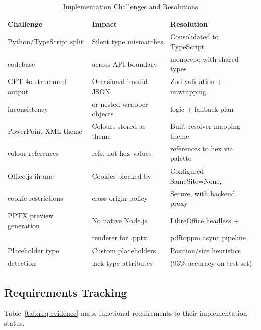 \begin{table}[H]
\centering
\begin{tabular}{|l|l|l|}
\hline
\rowcolor{gray!20} \textbf{Challenge} & \textbf{Impact} & \textbf{Resolution} \\
\hline
Python/TypeScript split & Silent type mismatches & Consolidated to TypeScript \\
codebase & across API boundary & monorepo with shared-types \\
\hline
GPT-4o structured output & Occasional invalid JSON & Zod validation + unwrapping \\
inconsistency & or nested wrapper objects & logic + fallback plan \\
\hline
PowerPoint XML theme & Colours stored as theme & Built resolver mapping theme \\
colour references & refs, not hex values & references to hex via palette \\
\hline
Office.js iframe & Cookies blocked by & Configured SameSite=None, \\
cookie restrictions & cross-origin policy & Secure, with backend proxy \\
\hline
PPTX preview generation & No native Node.js & LibreOffice headless + \\
 & renderer for .pptx & pdftoppm async pipeline \\
\hline
Placeholder type & Custom placeholders & Position/size heuristics \\
detection & lack type attributes & (93\% accuracy on test set) \\
\hline
\end{tabular}
\caption{Implementation Challenges and Resolutions}
\label{tab:challenges}
\end{table}

\subsection{Requirements Tracking}

Table~\ref{tab:req-evidence} maps functional requirements to their implementation status.

